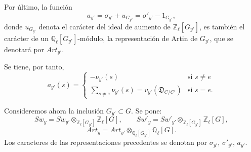Por último, la función
\[
a_{y'}=\sigma_{y'}+u_{G_{y'}}=\sigma'_{y'}-1_{G_{y'}},
\tag{4.2.5}
\]
donde $u_{G_{y'}}$ denota el carácter del ideal de aumento de $\mathbb Z_\ell[G_{y'}]$, es también el carácter de un $\mathbb Q_\ell[G_{y'}]$-módulo, la representación de Artin de $G_{y'}$, que se denotará por $Art_{y'}$.

Se tiene, por tanto,
\[
a_{y'}(s)=
\begin{cases}
-\nu_{y'}(s)& \text{si } s\ne e\\[0.4em]
\displaystyle\sum_{s\ne e}\nu_{y'}(s)=v_{y'}(\mathfrak D_{C/C'})& \text{si } s=e.
\end{cases}
\tag{4.2.6}
\]

Consideremos ahora la inclusión $G_{y'}\subset G$. Se pone:
\[
Sw_y=Sw_{y'}\otimes_{\mathbb Z_\ell[G_{y'}]}\mathbb Z_\ell[G],
\qquad
Sw'_y=Sw'_{y'}\otimes_{\mathbb Z_\ell[G_{y'}]}\mathbb Z_\ell[G],
\tag{4.2.7}
\]
\[
Art_y=Art_{y'}\otimes_{\mathbb Q_\ell[G_{y'}]}\mathbb Q_\ell[G].
\tag{4.2.8}
\]
Los caracteres de las representaciones precedentes se denotan por $\sigma_{y'}$, $\sigma'_{y'}$, $a_{y'}$.
